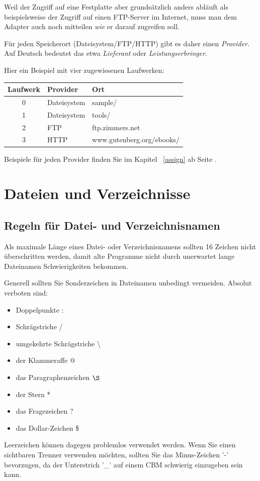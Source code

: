 \documentclass[10pt,a4paper]{scrartcl}		%
\begin{document}
Weil der Zugriff auf eine Festplatte aber grundsätzlich anders abläuft
als beispielsweise der Zugriff auf einen FTP-Server im Internet, 
muss man dem Adapter auch noch mitteilen \textit{wie} er darauf
zugreifen soll.

Für jeden Speicherort (Dateisystem/FTP/HTTP) gibt es daher einen 
\textit{Provider.} Auf Deutsch bedeutet das etwa \textit{Lieferant}
oder \textit{Leistungserbringer}. 

Hier ein Beispiel mit vier zugewiesenen Laufwerken:

\begin{tabular}[c]{c l l}
\toprule
Laufwerk & Provider & Ort \\
\midrule
0 & Dateisystem & sample/ \\
1 & Dateisystem & tools/ \\
2 & FTP & ftp.zimmers.net \\
3 & HTTP & www.gutenberg.org/ebooks/ \\
\bottomrule
\end{tabular}

Beispiele für jeden Provider finden Sie im Kapitel \ 
\ref{assign} \glqq{}\grqq{} ab Seite
\pageref{assign}.

\clearpage
\section{Dateien und Verzeichnisse}
\subsection{Regeln für Datei- und Verzeichnisnamen}
Als maximale Länge eines Datei- oder Verzeichnisnamens sollten
16 Zeichen nicht überschritten werden, damit alte Programme nicht
durch unerwartet lange Dateinamen Schwierigkeiten bekommen.

Generell sollten Sie Sonderzeichen in Dateinamen unbedingt 
vermeiden. Absolut verboten sind:
\begin{itemize}
\item Doppelpunkte :
\item Schrägstriche /
\item umgekehrte Schrägstriche \textbackslash
\item der Klammeraffe @
\item das Paragraphenzeichen $\S$
\item der Stern *
\item das Fragezeichen ? 
\item das Dollar-Zeichen \$
\end{itemize}
Leerzeichen können dagegen problemlos verwendet werden.
Wenn Sie einen sichtbaren Trenner verwenden möchten, sollten
Sie das Minus-Zeichen '-' bevorzugen, da der Unterstrich '\_' 
auf einem CBM schwierig einzugeben sein kann.
\end{document}
